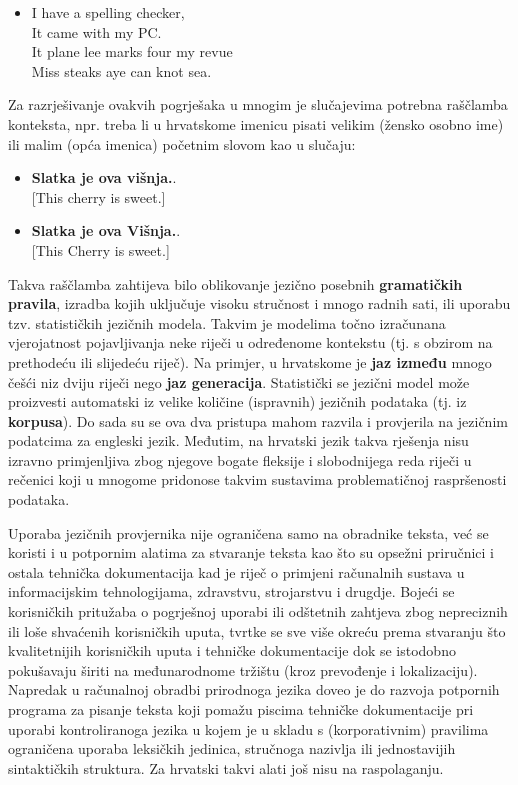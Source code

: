\begin{multicols}{2}
\begin{itemize}
\item[] I have a spelling checker,\\
  It came with my PC.\\
  It plane lee marks four my revue\\
  Miss steaks aye can knot sea.
\end{itemize}

Za razrješivanje ovakvih pogrješaka u mnogim je slučajevima potrebna raščlamba konteksta, npr. treba li u hrvatskome imenicu pisati velikim  (žensko osobno ime) ili malim (opća imenica) početnim slovom kao u slučaju:

\begin{itemize}
\item \textbf{Slatka je ova višnja.}.\\
  {[}This cherry is sweet.{]} 
\item \textbf{Slatka je ova Višnja.}.\\
  {[}This Cherry is sweet.{]}
\end{itemize}

Takva raščlamba zahtijeva bilo oblikovanje jezično posebnih \textbf{gramatičkih pravila}, izradba kojih uključuje visoku stručnost i mnogo radnih sati, ili uporabu tzv. statističkih jezičnih modela. Takvim je modelima točno izračunana vjerojatnost pojavljivanja neke riječi u određenome kontekstu (tj. s obzirom na prethodeću ili slijedeću riječ). Na primjer, u hrvatskome je \textbf{jaz između} mnogo češći niz dviju riječi nego \textbf{jaz generacija}. Statistički se jezični model može proizvesti automatski iz velike količine (ispravnih) jezičnih podataka (tj. iz \textbf{korpusa}). Do sada su se ova dva pristupa mahom razvila i provjerila na jezičnim podatcima za engleski jezik. Međutim, na hrvatski jezik takva rješenja nisu izravno primjenljiva zbog njegove bogate fleksije i slobodnijega reda riječi u rečenici koji u mnogome pridonose takvim sustavima problematičnoj raspršenosti podataka.

Uporaba jezičnih provjernika nije ograničena samo na obradnike teksta, već se koristi i u potpornim alatima za stvaranje teksta kao što su opsežni priručnici i ostala tehnička dokumentacija kad je riječ o primjeni računalnih sustava u informacijskim tehnologijama, zdravstvu, strojarstvu i drugdje. Bojeći se korisničkih pritužaba o pogrješnoj uporabi ili odštetnih zahtjeva zbog nepreciznih ili loše shvaćenih korisničkih uputa, tvrtke se sve više okreću prema stvaranju što kvalitetnijih korisničkih uputa i tehničke dokumentacije dok se istodobno pokušavaju širiti na međunarodnome tržištu (kroz prevođenje i lokalizaciju). Napredak u računalnoj obradbi prirodnoga jezika doveo je do razvoja potpornih programa za pisanje teksta koji pomažu piscima tehničke dokumentacije pri uporabi kontroliranoga jezika u kojem je u skladu s (korporativnim) pravilima ograničena uporaba leksičkih jedinica, stručnoga nazivlja ili jednostavijih sintaktičkih struktura. Za hrvatski takvi alati još nisu na raspolaganju.


\end{multicols}
